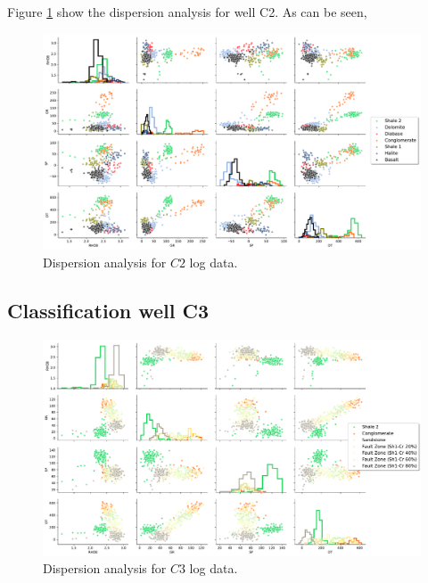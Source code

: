 \documentclass[preprint,12pt]{elsarticle}
\begin{document}
 Figure \ref{fig:C2_disp} show the dispersion analysis for well C2. As can be seen, 
 
\begin{figure}[!htb]
	\centering
	\includegraphics[scale=0.40]{imagens/C2dispersion_convolvido.pdf}
	\caption{Dispersion analysis for $C2$ log data. }
	\label{fig:C2_disp}
\end{figure}




\subsection{Classification well C3}
\begin{figure}[!htb]
	\centering
	\includegraphics[scale=0.38]{imagens/C3dispersion_convolvido.pdf}
	\caption{ Dispersion analysis for $C3$ log data.  }
	\label{fig:C3_disp}
\end{figure}
\end{document}
